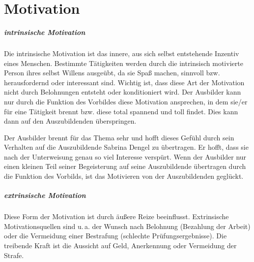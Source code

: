 \chapter{Motivation}

\paragraph{intrinsische Motivation}
Die intrinsische Motivation ist das innere, aus sich selbst entstehende Inzentiv eines Menschen. Bestimmte Tätigkeiten werden durch die intrinsisch motivierte Person ihres selbst Willens ausgeübt, da sie Spaß machen, sinnvoll bzw. herausfordernd oder interessant sind. Wichtig ist, dass diese Art der Motivation nicht durch Belohnungen entsteht oder konditioniert wird. Der Ausbilder kann nur durch die Funktion des Vorbildes diese Motivation ansprechen, in dem sie/er für eine Tätigkeit brennt bzw. diese total spannend und toll findet. Dies kann dann auf den Auszubildenden überspringen. 
\par
Der Ausbilder brennt für das Thema sehr und hofft dieses Gefühl durch sein Verhalten auf die Auszubildende Sabrina Dengel zu übertragen. Er hofft, dass sie nach der Unterweisung genau so viel Interesse verspürt. Wenn der Ausbilder nur einen kleinen Teil seiner Begeisterung auf seine Auszubildende übertragen durch die Funktion des Vorbilds, ist das Motivieren von der Auszubildenden geglückt. 

\paragraph{extrinsische Motivation}
Diese Form der Motivation ist durch äußere Reize beeinflusst. Extrinsische Motivationsquellen sind u.\,a. der Wunsch nach Belohnung (Bezahlung der Arbeit) oder die Vermeidung einer Bestrafung (schlechte Prüfungsergebnisse). Die treibende Kraft ist die Aussicht auf Geld, Anerkennung oder Vermeidung der Strafe.
\par
